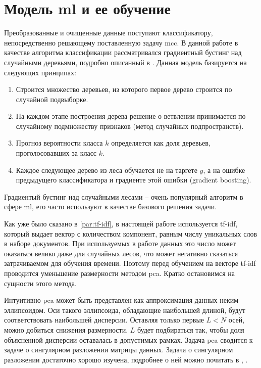 \section{Модель \acrshort{ml} и ее обучение}
\label{sec:training}
Преобразованные и очищенные данные поступают классификатору, непосредственно решающему поставленную задачу \acrlong{mcc}.
В данной работе в качестве алгоритма классификации рассматривался градиентный бустинг над случайными деревьями, подробно описанный в \cite{cite:xgboost}.
Данная модель базируется на следующих принципах:
\begin{enumerate}
    \item Строится множество деревьев, из которого первое дерево строится по случайной подвыборке.
    \item На каждом этапе построения дерева решение о ветвлении принимается по случайному подмножеству признаков (метод случайных подпространств).
    \item Прогноз вероятности класса $k$ определяется как доля деревьев, проголосовавших за класс $k$.
    \item Каждое следующее дерево из леса обучается не на таргете $y$, а на ошибке предыдущего классификатора и градиенте этой ошибки (gradient boosting).
\end{enumerate}
Градиентый бустинг над случайными лесами -- очень популярный алгоритм в сфере \acrshort{ml}, его часто используют в качестве базового решения задачи.

Как уже было сказано в \ref{par:tf-idf}, в настоящей работе используется \acrshort{tf-idf}, который выдает вектор с количеством компонент, равным числу уникальных слов в наборе документов.
При используемых в работе данных это число может оказаться велико даже для случайных лесов, что может негативно сказаться затрачиваемом для обучения времени.
Поэтому перед обучением на векторе \acrshort{tf-idf} проводится уменьшение размерности методом \gls{pca}.
Кратко остановимся на сущности этого метода.

Интуитивно \gls{pca} может быть представлен как аппроксимация данных неким эллипсоидом.
Оси такого эллипсоида, обладающие наибольшей длиной, будут соответствовать наибольшей дисперсии.
Оставляя только первые $L < N$ осей, можно добиться снижения размерности.
$L$ будет подбираться так, чтобы доля объясненной дисперсии оставалась в допустимых рамках.
Задача \gls{pca} сводится к задаче о сингулярном разложении матрицы данных.
Задача о сингулярном разложении достаточно хорошо изучена, подробнее о ней можно почитать в \cite{cite:svd-1}, \cite{cite:svd-2}.

